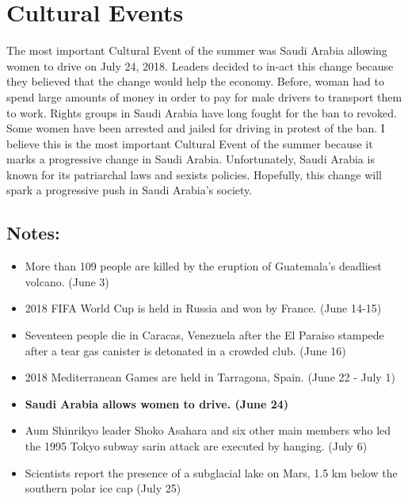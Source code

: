 \documentclass[12pt]{article} %
\begin{document}
\section{Cultural Events}
The most important Cultural Event of the summer was Saudi Arabia allowing women to drive on
July 24, 2018. Leaders decided to in-act this change because they believed that the change would help
the economy. Before, woman had to spend large amounts of money in order to pay for male drivers to
transport them to work. Rights groups in Saudi Arabia have long fought for the ban to revoked. Some
women have been arrested and jailed for driving in protest of the ban. I believe this is the most 
important Cultural Event of the summer because it marks a progressive change in Saudi Arabia. 
Unfortunately, Saudi Arabia is known for its patriarchal laws and sexists policies. Hopefully, this
change will spark a progressive push in Saudi Arabia's society.
\subsection*{Notes:}
\begin{itemize}
	\item More than 109 people are killed by the eruption of Guatemala's deadliest volcano. (June 3)
	\item 2018 FIFA World Cup is held in Russia and won by France. (June 14-15)
	\item Seventeen people die in Caracas, Venezuela after the El Paraiso stampede after a tear gas
	canister is detonated in a crowded club. (June 16)
	\item 2018 Mediterranean Games are held in Tarragona, Spain. (June 22 - July 1)
	\item \textbf{Saudi Arabia allows women to drive. (June 24)}
	\item Aum Shinrikyo leader Shoko Asahara and six other main members who led the 1995 Tokyo subway
	sarin attack are executed by hanging. (July 6)
	\item Scientists report the presence of a subglacial lake on Mars, 1.5 km below the southern polar 
	ice cap (July 25)
\end{itemize}
\end{document}
